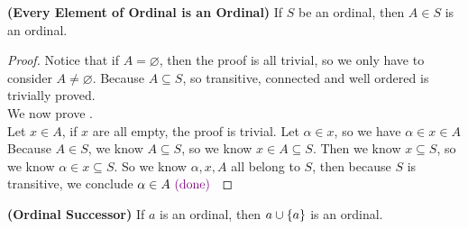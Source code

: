 \documentclass{report}
\begin{document}
\begin{theorem}
\label{2.2.7}
\textbf{(Every Element of Ordinal is an Ordinal)} If $S$ be an ordinal, then  $A \in S$ is an ordinal.
\end{theorem}
\begin{proof}
Notice that if $A=\varnothing$, then the proof is all trivial, so we only have to consider $A\neq \varnothing$. Because $A \subseteq S$, so transitive,  connected and well ordered is trivially proved.\\




We now prove .\\

Let $x\in A$, if $x$ are all empty, the proof is trivial. Let $\alpha \in x$, so we have $\alpha \in x \in A$\\

Because $A\in S$, we know $A \subseteq S$, so we know $x \in A \subseteq S$. Then we know $x \subseteq S$, so we know $\alpha \in x \subseteq S$. So we know $\alpha ,x,A$ all belong to $S$, then because $S$ is transitive, we conclude  $\alpha \in A\textcolor{violet}{\text{ (done) }} $
\end{proof}
\begin{theorem}
\label{2.2.8}
\textbf{(Ordinal Successor)}
If $a$ is an ordinal, then  $a\cup \{ a \}$ is an ordinal.
\end{theorem}
\end{document}
